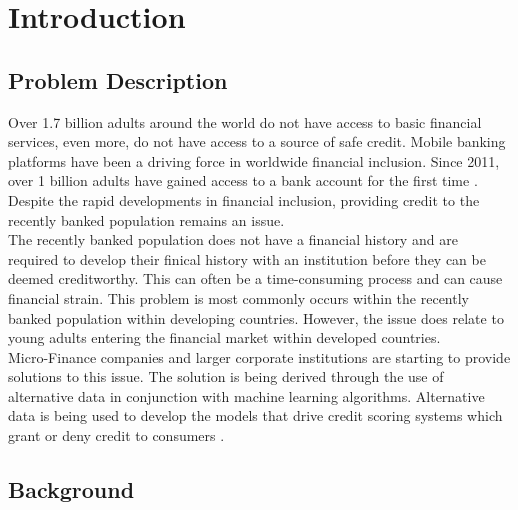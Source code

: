 \chapter{Introduction} 
\label{Chapter1}

\section{Problem Description}

Over 1.7 billion adults around the world do not have access to basic financial services, even more, do not have access to a source of safe credit. Mobile banking platforms have been a driving force in worldwide financial inclusion. Since 2011, over 1 billion adults have gained access to a bank account for the first time \parencite{WorldBank}. Despite the rapid developments in financial inclusion, providing credit to the recently banked population remains an issue. \\

The recently banked population does not have a financial history and are required to develop their finical history with an institution before they can be deemed creditworthy. This can often be a time-consuming process and can cause financial strain. This problem is most commonly occurs within the recently banked population within developing countries. However, the issue does relate to young adults entering the financial market within developed countries. \\

Micro-Finance companies and larger corporate institutions are starting to provide solutions to this issue. The solution is being derived through the use of alternative data in conjunction with machine learning algorithms. Alternative data is being used to develop the models that drive credit scoring systems which grant or deny credit to consumers \parencite{BigDataMicroFiance}. 


\section{Background}

